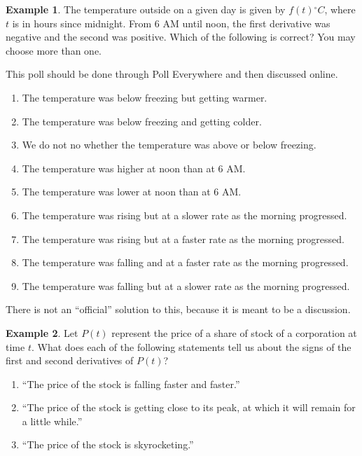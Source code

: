 \documentclass[oneside]{book}
\theoremstyle{definition}
\newtheorem{example}{Example}
\theoremstyle{solution}
\newtheorem*{solution}{Solution}
\newenvironment{solution}{\vspace{2in}\comment}{\endcomment}
\begin{document}
\begin{example}
  The temperature outside on a given day is given by $f(t){}^\circ C$,
  where $t$ is in hours since midnight.  From 6 AM until noon, the
  first derivative was negative and the second was positive.  Which of
  the following is correct?  You may choose more than one.

  This poll should be done through Poll Everywhere and then discussed
  online.  

  \begin{enumerate}
  \item The temperature was below freezing but getting warmer.
  \item The temperature was below freezing and getting colder.
  \item We do not no whether the temperature was above or below freezing.
  \item The temperature was higher at noon than at 6 AM.
  \item The temperature was lower at noon than at 6 AM.
  \item The temperature was rising but at a slower rate as the morning progressed.
  \item The temperature was rising but at a faster rate as the morning progressed.
  \item The temperature was falling and at a faster rate as the morning progressed.
  \item The temperature was falling but at a slower rate as the morning progressed.
  \end{enumerate}
  \end{example}

\begin{solution}
There is not an ``official'' solution to this, because it is meant to
be a discussion.
\end{solution}

\begin{example}
  Let $P(t)$ represent the price of a share of stock of a corporation
  at time $t$. What does each of the following statements tell us
  about the signs of the first and second derivatives of $P(t)$?
  
\begin{enumerate}
\item ``The price of the stock is falling faster and faster.''
\item ``The price of the stock is getting close to its peak, at which
  it will remain for a little while.'' 
\item ``The price of the stock is skyrocketing.''
\end{enumerate}
\end{example}
\end{document}
